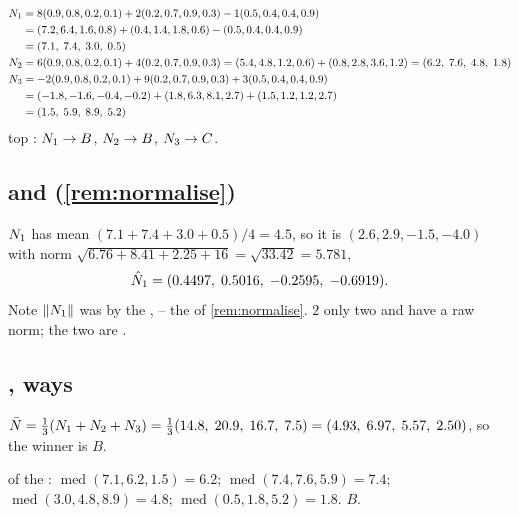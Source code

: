 \begin{align*}
N_1 &= 8(0.9,0.8,0.2,0.1)+2(0.2,0.7,0.9,0.3)-1(0.5,0.4,0.4,0.9)\\
      &= (7.2,6.4,1.6,0.8)+(0.4,1.4,1.8,0.6)-(0.5,0.4,0.4,0.9)\\
      &= (7.1,\;7.4,\;3.0,\;0.5)\\
N_2 &= 6(0.9,0.8,0.2,0.1)+4(0.2,0.7,0.9,0.3)
       = (5.4,4.8,1.2,0.6)+(0.8,2.8,3.6,1.2) = (6.2,\;7.6,\;4.8,\;1.8)\\
N_3 &= -2(0.9,0.8,0.2,0.1)+9(0.2,0.7,0.9,0.3)+3(0.5,0.4,0.4,0.9)\\
      &= (-1.8,-1.6,-0.4,-0.2)+(1.8,6.3,8.1,2.7)+(1.5,1.2,1.2,2.7)\\
      &= (1.5,\;5.9,\;8.9,\;5.2)
\end{align*}
 top : $N_1 \to B$, $N_2 \to B$, $N_3 \to C$.

\subsection{ and  (\cref{rem:normalise})}

$N_1$ has mean $(7.1+7.4+3.0+0.5)/4 = 4.5$, so  it is
$(2.6,2.9,-1.5,-4.0)$ with norm
$\sqrt{6.76+8.41+2.25+16}=\sqrt{33.42}=5.781$, 
\[
\hat {N}_1 = (0.4497,\;0.5016,\;-0.2595,\;-0.6919).
\]
Note $\|N_1\|$   was  by the  ,  
 --  the  of \cref{rem:normalise}.  $2$  only two
 and  have a   raw norm;  
the two are .

\subsection{,  ways}

 $\bar{N} = \tfrac13(N_1+N_2+N_3)
= \tfrac13(14.8,\;20.9,\;16.7,\;7.5) = (4.93,\;6.97,\;5.57,\;2.50)$, so the winner
is $B$.

   of the  :
$\operatorname{med}(7.1,6.2,1.5)=6.2$;
$\operatorname{med}(7.4,7.6,5.9)=7.4$;
$\operatorname{med}(3.0,4.8,8.9)=4.8$;
$\operatorname{med}(0.5,1.8,5.2)=1.8$.  $B$.

